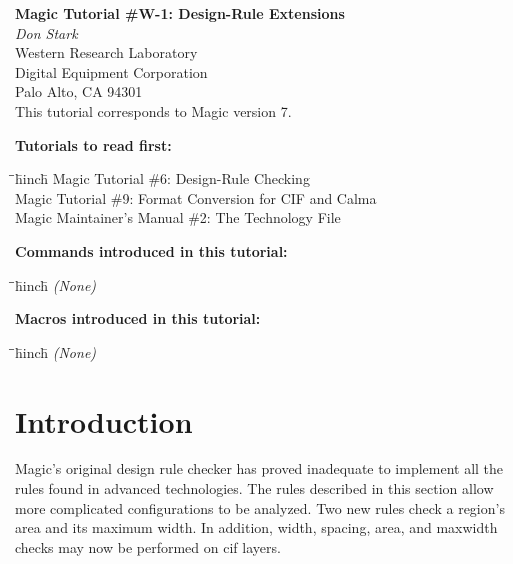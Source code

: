 \documentclass[letterpaper,twoside,12pt]{article}
\def\hinch{\hspace*{0.5in}}
\def\starti{\begin{center}\begin{tabbing}\hinch\=\hinch\=\hinch\=hinch\hinch\=\kill}
\def\endi{\end{tabbing}\end{center}}
\def\mytitle{Magic Tutorial \#W-1: Design-Rule Extensions}
\begin{document}
\makeatletter
\newcommand{\ps@magic}{%
	\renewcommand{\@oddhead}{\mytitle\hfil\today}%
	\renewcommand{\@evenhead}{\today\hfil\mytitle}%
	\renewcommand{\@evenfoot}{\hfil\textrm{--{\thepage}--}\hfil}%
	\renewcommand{\@oddfoot}{\@evenfoot}}
\newcommand{\ps@mplain}{%
	\renewcommand{\@oddhead}{}%
	\renewcommand{\@evenhead}{}%
	\renewcommand{\@evenfoot}{\hfil\textrm{--{\thepage}--}\hfil}%
	\renewcommand{\@oddfoot}{\@evenfoot}}
\makeatother
\pagestyle{magic}
\thispagestyle{mplain}


\begin{center}
  {\bfseries \Large \mytitle} \\
  \vspace*{0.5in}
  {\itshape Don Stark} \\
  \vspace*{0.5in}
   Western Research Laboratory \\
   Digital Equipment Corporation \\
   Palo Alto, CA  94301 \\
  \vspace*{0.25in}
  This tutorial corresponds to Magic version 7. \\
\end{center}
\vspace*{0.5in}

{\noindent\bfseries\large Tutorials to read first:}
\starti
   \> Magic Tutorial \#6: Design-Rule Checking \\
   \> Magic Tutorial \#9: Format Conversion for CIF and Calma \\
   \> Magic Maintainer's Manual \#2: The Technology File
\endi

{\noindent\bfseries\large Commands introduced in this tutorial:}
\starti
   \> {\itshape (None)}
\endi

{\noindent\bfseries\large Macros introduced in this tutorial:}

\starti
   \> {\itshape (None)}
\endi

\vspace*{0.25in}
\section{Introduction}

Magic's original design rule checker has proved inadequate to implement all
the rules found in advanced technologies.  The rules described
in this section allow more complicated configurations to be analyzed.
Two new rules check a region's area and its maximum width.  In addition,
width, spacing, area, and maxwidth checks may now be performed on cif layers.
\end{document}
